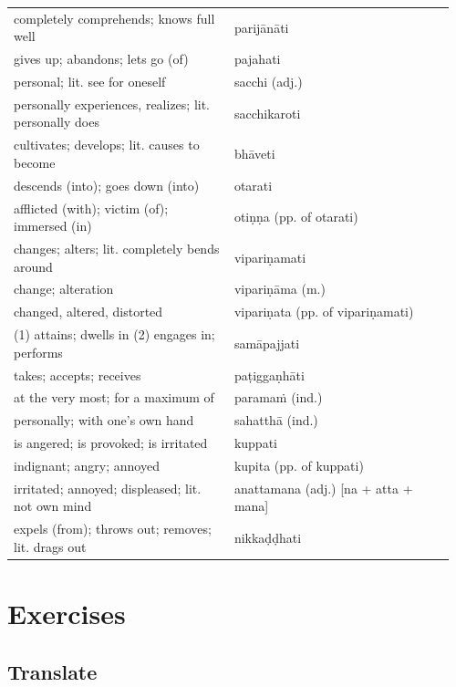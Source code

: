 \documentclass[11pt,oneside]{memoir}
\begin{document}
\begin{longtable}{L{0.48\linewidth} L{0.48\linewidth}}
completely comprehends; knows full well & parijānāti\\
gives up; abandons; lets go (of) & pajahati\\
personal; lit. see for oneself & sacchi (adj.)\\
personally experiences, realizes; lit. personally does & sacchikaroti\\
cultivates; develops; lit. causes to become & bhāveti\\
descends (into); goes down (into) & otarati\\
afflicted (with); victim (of); immersed (in) & otiṇṇa (pp. of otarati)\\
changes; alters; lit. completely bends around & vipariṇamati\\
change; alteration & vipariṇāma (m.)\\
changed, altered, distorted & vipariṇata (pp. of vipariṇamati)\\
(1) attains; dwells in (2) engages in; performs & samāpajjati\\
takes; accepts; receives & paṭiggaṇhāti\\
at the very most; for a maximum of & paramaṁ (ind.)\\
personally; with one’s own hand & sahatthā (ind.)\\
is angered; is provoked; is irritated & kuppati\\
indignant; angry; annoyed & kupita (pp. of kuppati)\\
irritated; annoyed; displeased; lit. not own mind & anattamana (adj.) [na + atta + mana]\\
expels (from); throws out; removes; lit. drags out & nikkaḍḍhati\\
\end{longtable}

\clearpage
\section{Exercises}
\label{sec:org108675f}
\subsection{Translate}
\label{sec:orgbf77570}
\end{document}
